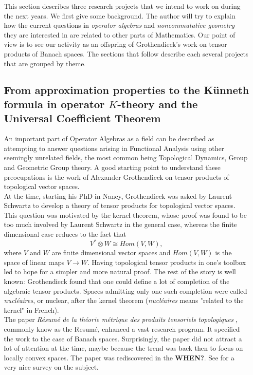 This section describes three research projects that we intend to work on during the next years. We first give some background. The author will try to explain how the current questions in \textit{operator algebras} and \textit{noncommutative geometry} they are interested in are related to other parts of Mathematics. Our point of view is to see our activity as an offspring of Grothendieck's work on tensor products of Banach spaces. The sections that follow describe each several projects that are grouped by theme.   

\subsection{From approximation properties to the K\"unneth formula in operator $K$-theory and the Universal Coefficient Theorem}

An important part of Operator Algebras as a field can be described as attempting to answer questions arising in Functional Analysis using other seemingly unrelated fields, the most common being Topological Dynamics, Group and Geometric Group theory. A good starting point to understand these preocupations is the work of Alexander Grothendieck on tensor products of topological vector spaces. \\

At the time, starting his PhD in Nancy, Grothendieck was asked by Laurent Schwartz to develop a theory of tensor products for topological vector spaces. This question was motivated by the kernel theorem, whose proof was found to be too much involved by Laurent Schwartz in the general case, whereas the finite dimensional case reduces to the fact that 
\[V^*\otimes W \cong Hom(V,W),\] 
where $V$ and $W$ are finite dimensional vector spaces and $Hom(V,W)$ is the space of linear maps $V\rightarrow W$. Having topological tensor products in one's toolbox led to hope for a simpler and more natural proof. The rest of the story is well known: Grothendieck found that one could define a lot of completion of the algebraic tensor products. Spaces admitting only one such completion were called \textit{nucl\'eaires}, or nuclear, after the kernel theorem (\textit{nucl\'eaires} means "related to the kernel" in French).\\

The paper \textit{R\'esum\'e de la th\'eorie m\'etrique des produits tensoriels topologiques} \cite{GrothendieckResume}, commonly know as the Resum\'e, enhanced a vast research program. It specified the work to the case of Banach spaces. Surprisingly, the paper did not attract a lot of attention at the time, maybe because the trend was back then to focus on locally convex spaces. The paper was rediscovered in the \textbf{WHEN?}. See \cite{PisierSurvey} for a very nice survey on the subject.\\


